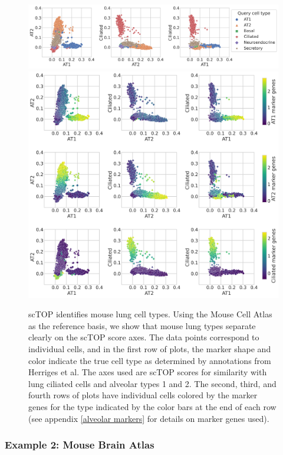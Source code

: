 \documentclass[aps,superscriptaddress, notitlepage,longbibliography]{revtex4-1}
\begin{document}
\begin{figure}
	\centering
		\includegraphics[scale=0.45]{figs/herriges colored by type.png}
        \includegraphics[scale=0.5]{figs/herriges colored by signature.png}
	\caption{scTOP identifies mouse lung cell types. Using the Mouse Cell Atlas as the reference basis, we show that mouse lung types separate clearly on the scTOP score axes. The data points correspond to individual cells, and in the first row of plots, the marker shape and color indicate the true cell type as determined by annotations from Herriges et al. The axes used are scTOP scores for similarity with lung ciliated cells and alveolar types 1 and 2. The second, third, and fourth rows of plots have individual cells colored by the marker genes for the type indicated by the color bars at the end of each row (see appendix \ref{alveolar markers} for details on marker genes used).}
	\label{herriges}
\end{figure}

\subsubsection{Example 2: Mouse Brain Atlas}
\end{document}
